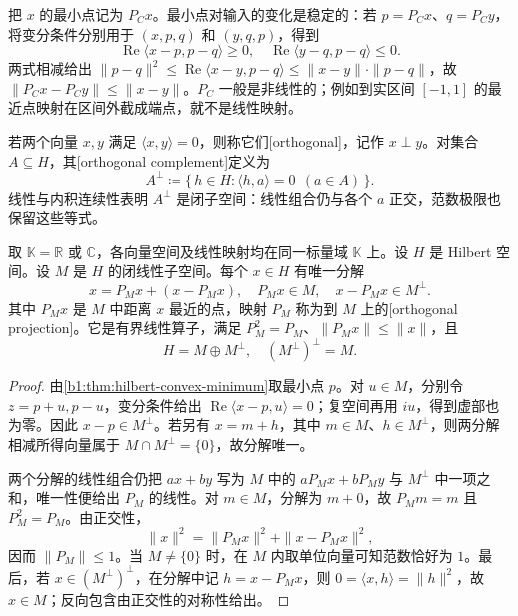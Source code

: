 把 \(x\) 的最小点记为 \(P_Cx\)。最小点对输入的变化是稳定的：若 \(p=P_Cx\)、\(q=P_Cy\)，将变分条件分别用于 \((x,p,q)\) 和 \((y,q,p)\)，得到
\[
\operatorname{Re}\langle x-p,p-q\rangle\geq0,
\quad
\operatorname{Re}\langle y-q,p-q\rangle\leq0.
\]
两式相减给出 \(\|p-q\|^2\leq\operatorname{Re}\langle x-y,p-q\rangle\leq\|x-y\|\cdot\|p-q\|\)，故 \(\|P_Cx-P_Cy\|\leq\|x-y\|\)。\(P_C\) 一般是非线性的；例如到实区间 \([-1,1]\) 的最近点映射在区间外截成端点，就不是线性映射。

\ProseParagraphBreak

若两个向量 \(x,y\) 满足 \(\langle x,y\rangle=0\)，则称它们[orthogonal]，记作 \(x\perp y\)。对集合 \(A\subseteq H\)，其[orthogonal complement]定义为
\[
A^\perp\coloneqq\{\,h\in H:\langle h,a\rangle=0\ \ (a\in A)\,\}.
\]
线性与内积连续性表明 \(A^\perp\) 是闭子空间：线性组合仍与各个 \(a\) 正交，范数极限也保留这些等式。

\begin{theorem}\label{b1:thm:hilbert-projection}
取 \(\mathbb K=\mathbb R\) 或 \(\mathbb C\)，各向量空间及线性映射均在同一标量域 \(\mathbb K\) 上。设 \(H\) 是 Hilbert 空间。设 \(M\) 是 \(H\) 的闭线性子空间。每个 \(x\in H\) 有唯一分解
\[
x=P_Mx+(x-P_Mx),
\quad P_Mx\in M,
\quad x-P_Mx\in M^\perp.
\]
其中 \(P_Mx\) 是 \(M\) 中距离 \(x\) 最近的点，映射 \(P_M\) 称为到 \(M\) 上的[orthogonal projection]。它是有界线性算子，满足 \(P_M^2=P_M\)、\(\|P_Mx\|\leq\|x\|\)，且
\[
H=M\oplus M^\perp,
\quad (M^\perp)^\perp=M.
\]
\end{theorem}
\begin{proof}
由\cref{b1:thm:hilbert-convex-minimum}取最小点 \(p\)。对 \(u\in M\)，分别令 \(z=p+u,p-u\)，变分条件给出 \(\operatorname{Re}\langle x-p,u\rangle=0\)；复空间再用 \(iu\)，得到虚部也为零。因此 \(x-p\in M^\perp\)。若另有 \(x=m+h\)，其中 \(m\in M\)、\(h\in M^\perp\)，则两分解相减所得向量属于 \(M\cap M^\perp=\{0\}\)，故分解唯一。

两个分解的线性组合仍把 \(ax+by\) 写为 \(M\) 中的 \(aP_Mx+bP_My\) 与 \(M^\perp\) 中一项之和，唯一性便给出 \(P_M\) 的线性。对 \(m\in M\)，分解为 \(m+0\)，故 \(P_Mm=m\) 且 \(P_M^2=P_M\)。由正交性，
\[
\|x\|^2=\|P_Mx\|^2+\|x-P_Mx\|^2,
\]
因而 \(\|P_M\|\leq1\)。当 \(M\ne\{0\}\) 时，在 \(M\) 内取单位向量可知范数恰好为 \(1\)。最后，若 \(x\in(M^\perp)^\perp\)，在分解中记 \(h=x-P_Mx\)，则 \(0=\langle x,h\rangle=\|h\|^2\)，故 \(x\in M\)；反向包含由正交性的对称性给出。
\end{proof}

